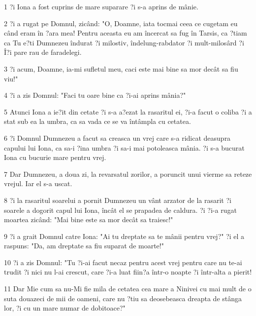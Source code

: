 \par 1 ?i Iona a fost cuprins de mare suparare ?i s-a aprins de mânie.
\par 2 ?i a rugat pe Domnul, zicând: "O, Doamne, iata tocmai ceea ce cugetam eu când eram în ?ara mea! Pentru aceasta eu am încercat sa fug în Tarsis, ca ?tiam ca Tu e?ti Dumnezeu îndurat ?i milostiv, îndelung-rabdator ?i mult-milosârd ?i Î?i pare rau de faradelegi.
\par 3 ?i acum, Doamne, ia-mi sufletul meu, caci este mai bine sa mor decât sa fiu viu!"
\par 4 ?i a zis Domnul: "Faci tu oare bine ca ?i-ai aprins mânia?"
\par 5 Atunci Iona a ie?it din cetate ?i s-a a?ezat la rasaritul ei, ?i-a facut o coliba ?i a stat sub ea la umbra, ca sa vada ce se va întâmpla cu cetatea.
\par 6 ?i Domnul Dumnezeu a facut sa creasca un vrej care s-a ridicat deasupra capului lui Iona, ca sa-i ?ina umbra ?i sa-i mai potoleasca mânia. ?i s-a bucurat Iona cu bucurie mare pentru vrej.
\par 7 Dar Dumnezeu, a doua zi, la revarsatul zorilor, a poruncit unui vierme sa reteze vrejul. Iar el s-a uscat.
\par 8 ?i la rasaritul soarelui a pornit Dumnezeu un vânt arzator de la rasarit ?i soarele a dogorit capul lui Iona, încât el se prapadea de caldura. ?i ?i-a rugat moartea zicând: "Mai bine este sa mor decât sa traiesc!"
\par 9 ?i a grait Domnul catre Iona: "Ai tu dreptate sa te mânii pentru vrej?" ?i el a raspuns: "Da, am dreptate sa fiu suparat de moarte!"
\par 10 ?i a zis Domnul: "Tu ?i-ai facut necaz pentru acest vrej pentru care nu te-ai trudit ?i nici nu l-ai crescut, care ?i-a luat fiin?a într-o noapte ?i într-alta a pierit!
\par 11 Dar Mie cum sa nu-Mi fie mila de cetatea cea mare a Ninivei cu mai mult de o suta douazeci de mii de oameni, care nu ?tiu sa deosebeasca dreapta de stânga lor, ?i cu un mare numar de dobitoace?"


